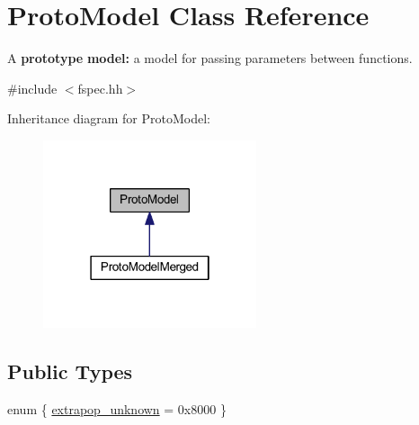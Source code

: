 \hypertarget{class_proto_model}{}\section{Proto\+Model Class Reference}
\label{class_proto_model}


A {\bfseries{prototype}} {\bfseries{model\+:}} a model for passing parameters between functions.  




{\ttfamily \#include $<$fspec.\+hh$>$}



Inheritance diagram for Proto\+Model\+:
\nopagebreak
\begin{figure}[H]
\begin{center}
\leavevmode
\includegraphics[width=178pt]{class_proto_model__inherit__graph}
\end{center}
\end{figure}
\subsection*{Public Types}
\begin{DoxyCompactItemize}
\item 
enum \{ \mbox{\hyperlink{class_proto_model_ab532221dd4a9946b2dea90be44c79879ab0874d825448e7c731717fad59bbec92}{extrapop\+\_\+unknown}} = 0x8000
 \}
\end{DoxyCompactItemize}
